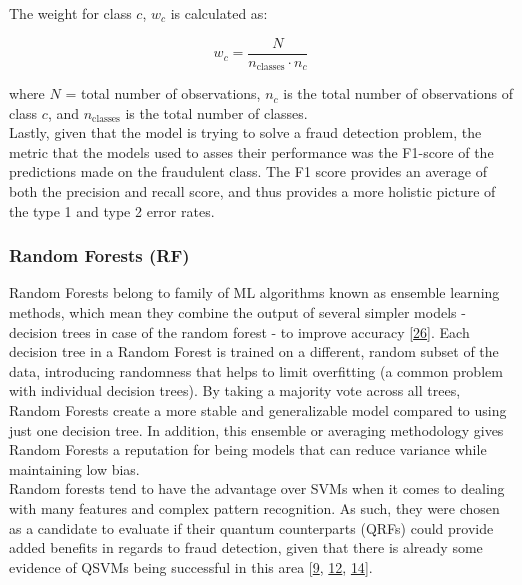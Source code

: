 \documentclass[11pt, oneside]{article}   	%
\begin{document}
The weight for class $c$, $w_c$ is calculated as:

\begin{equation}
w_c = \frac{N}{n_{\text{classes}}\cdot n_c}
\end{equation}

where $N$ = total number of observations, $n_c$ is the total number of observations of class  $c$, and $n_{\text{classes}}$ is the total number of classes. \\

Lastly, given that the model is trying to solve a fraud detection problem, the metric that the models used to asses their performance was the F1-score of the predictions made on the fraudulent class. The F1 score provides an average of both the precision and recall score, and thus provides a more holistic picture of the type 1 and type 2 error rates.  




\subsubsection{Random Forests (RF)}

\hspace{10mm}Random Forests belong to family of ML algorithms known as ensemble learning methods, which mean they combine the output of several simpler models - decision trees in case of the random forest - to improve accuracy [\href{https://doi.org/10.1023/A:1010933404324}{26}]. Each decision tree in a Random Forest is trained on a different, random subset of the data, introducing randomness that helps to limit overfitting (a common problem with individual decision trees). By taking a majority vote across all trees, Random Forests create a more stable and generalizable model compared to using just one decision tree. In addition, this ensemble or averaging methodology gives Random Forests a reputation for being models that can reduce variance while maintaining low bias. \\

\noindent\hspace{10mm}Random forests tend to have the advantage over SVMs when it comes to dealing with many features and complex pattern recognition. As such, they were chosen as a candidate to evaluate if their quantum counterparts (QRFs) could provide added benefits in regards to fraud detection, given that there is already some evidence of QSVMs being successful in this area [\href{https://www.researchsquare.com/article/rs-1434074/v1}{9}, \href{https://doi.org/10.34190/eccws.23.1.2258}{12}, \href{
https://doi.org/10.48550/arXiv.2208.01203}{14}].
\end{document}
